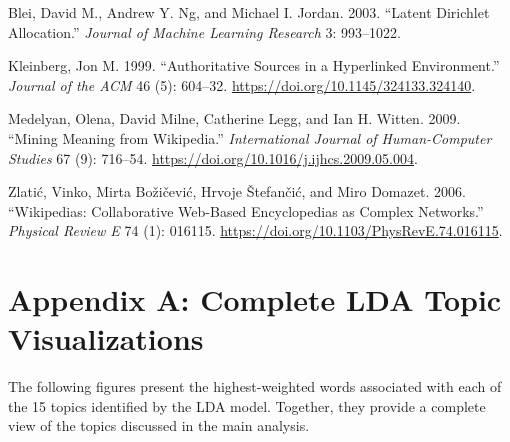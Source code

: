 \documentclass[
  letterpaper,
  DIV=11,
  numbers=noendperiod]{scrartcl}
\newlength{\cslhangindent}
\newenvironment{CSLReferences}[2] %
 {\begin{list}{}{%
  \setlength{\itemindent}{0pt}
  \setlength{\leftmargin}{0pt}
  \setlength{\parsep}{0pt}
  \ifodd #1
   \setlength{\leftmargin}{\cslhangindent}
   \setlength{\itemindent}{-1\cslhangindent}
  \fi
  \setlength{\itemsep}{#2\baselineskip}}}
 {\end{list}}
\begin{document}
\label{refs}
\begin{CSLReferences}{1}{0}
Blei, David M., Andrew Y. Ng, and Michael I. Jordan. 2003. {``Latent
Dirichlet Allocation.''} \emph{Journal of Machine Learning Research} 3:
993--1022.

Kleinberg, Jon M. 1999. {``Authoritative Sources in a Hyperlinked
Environment.''} \emph{Journal of the ACM} 46 (5): 604--32.
\url{https://doi.org/10.1145/324133.324140}.

Medelyan, Olena, David Milne, Catherine Legg, and Ian H. Witten. 2009.
{``Mining Meaning from Wikipedia.''} \emph{International Journal of
Human-Computer Studies} 67 (9): 716--54.
\url{https://doi.org/10.1016/j.ijhcs.2009.05.004}.

Zlatić, Vinko, Mirta Božičević, Hrvoje Štefančić, and Miro Domazet.
2006. {``Wikipedias: Collaborative Web-Based Encyclopedias as Complex
Networks.''} \emph{Physical Review E} 74 (1): 016115.
\url{https://doi.org/10.1103/PhysRevE.74.016115}.

\end{CSLReferences}

\section{Appendix A: Complete LDA Topic
Visualizations}\label{appendix-a-complete-lda-topic-visualizations}

The following figures present the highest-weighted words associated with
each of the 15 topics identified by the LDA model. Together, they
provide a complete view of the topics discussed in the main analysis.
\end{document}
